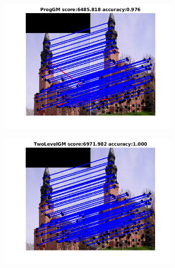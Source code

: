 \documentclass[
	fontsize=12pt,
	paper=a4,
	twoside=false,
	numbers=noenddot,
	plainheadsepline,
	toc=listof,
	toc=bibliography
]{scrartcl}
\begin{document}
\begin{figure}[h]
	\begin{subfigure}[b]{0.3\textwidth}
		\centering
		\includegraphics[scale=0.4]{"fig_ver2608/RealImages/Img_trafo/no_descr/using_cdf_afftrafo/fi_2_ProgGM"} 
	\end{subfigure}%
	\begin{subfigure}[b]{0.3\textwidth}
		\centering
		\includegraphics[scale=0.4]{"fig_ver2608/RealImages/Img_trafo/no_descr/using_cdf_afftrafo/fi_2_2lGM"} 
	\end{subfigure} 
	\begin{subfigure}[b]{0.3\textwidth}
		\centering

\end{subfigure}
\end{figure}
\end{document}
